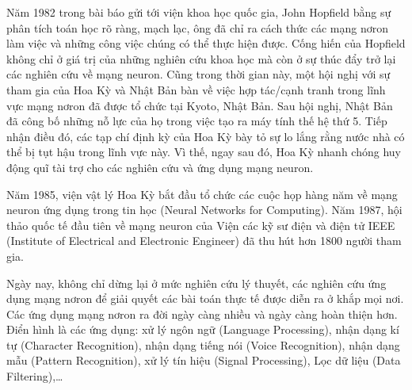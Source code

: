 Năm 1982 trong bài báo gửi tới viện khoa học quốc gia, John Hopfield bằng sự phân tích toán học rõ ràng, mạch lạc, ông đã chỉ ra cách thức các mạng nơron làm việc và những công việc chúng có thể thực hiện được. Cống hiến của Hopfield không chỉ ở giá trị của những nghiên cứu khoa học mà còn ở sự thúc đẩy trở lại các nghiên cứu về mạng neuron. 
Cũng trong thời gian này, một hội nghị với sự tham gia của Hoa Kỳ và Nhật Bản bàn về việc hợp tác/cạnh tranh trong lĩnh vực mạng nơron đã được tổ chức tại Kyoto, Nhật Bản. Sau hội nghị, Nhật Bản đã công bố những nỗ lực của họ trong việc tạo ra máy tính thế hệ thứ 5. Tiếp nhận điều đó, các tạp chí định kỳ của Hoa Kỳ bày tỏ sự lo lắng rằng nước nhà có thể bị tụt hậu trong lĩnh vực này. Vì thế, ngay sau đó, Hoa Kỳ nhanh chóng huy động quĩ tài trợ cho các nghiên cứu và ứng dụng mạng neuron. 

Năm 1985, viện vật lý Hoa Kỳ bắt đầu tổ chức các cuộc họp hàng năm về mạng neuron ứng dụng trong tin học (Neural Networks for Computing). 
Năm 1987, hội thảo quốc tế đầu tiên về mạng neuron của Viện các kỹ sư điện và điện tử IEEE (Institute of Electrical and Electronic Engineer) đã thu hút hơn 1800 người tham gia. 

Ngày nay, không chỉ dừng lại ở mức nghiên cứu lý thuyết, các nghiên cứu ứng dụng mạng nơron để giải quyết các bài toán thực tế được diễn ra ở khắp mọi nơi. Các ứng dụng mạng nơron ra đời ngày càng nhiều và ngày càng hoàn thiện hơn. Điển hình là các ứng dụng: xử lý ngôn ngữ (Language Processing), nhận dạng kí tự (Character Recognition), nhận dạng tiếng nói (Voice Recognition), nhận dạng mẫu (Pattern Recognition), xử lý tín hiệu (Signal Processing), Lọc dữ liệu (Data Filtering),\ldots 

